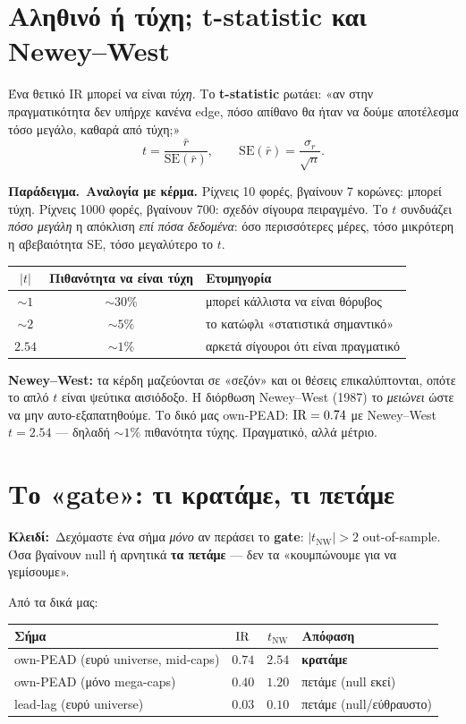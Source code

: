 \documentclass[11pt]{article}
\newcommand{\key}[1]{\par\medskip\noindent\colorbox{soft}{\parbox{\dimexpr\linewidth-2\fboxsep}{\textcolor{accent}{\textbf{Κλειδί:}}\ #1}}\par\medskip}
\newcommand{\ex}[1]{\par\smallskip\noindent\textbf{\textcolor{accent}{Παράδειγμα.}}\ #1\par\smallskip}
\begin{document}
\section{Αληθινό ή τύχη; t-statistic και Newey--West}

Ένα θετικό IR μπορεί να είναι \emph{τύχη}. Το \textbf{t-statistic} ρωτάει: «αν στην πραγματικότητα δεν
υπήρχε κανένα edge, πόσο απίθανο θα ήταν να δούμε αποτέλεσμα τόσο μεγάλο, καθαρά από τύχη;»
\[
t=\frac{\bar r}{\mathrm{SE}(\bar r)},\qquad \mathrm{SE}(\bar r)=\frac{\sigma_r}{\sqrt{n}}.
\]

\ex{\textbf{Αναλογία με κέρμα.} Ρίχνεις 10 φορές, βγαίνουν 7 κορώνες: μπορεί τύχη. Ρίχνεις 1000 φορές,
βγαίνουν 700: σχεδόν σίγουρα πειραγμένο. Το $t$ συνδυάζει \emph{πόσο μεγάλη} η απόκλιση \emph{επί πόσα
δεδομένα}: όσο περισσότερες μέρες, τόσο μικρότερη η αβεβαιότητα $\mathrm{SE}$, τόσο μεγαλύτερο το $t$.}

\begin{center}
\begin{tabular}{ccl}
\toprule
$|t|$ & Πιθανότητα να είναι τύχη & Ετυμηγορία\\
\midrule
$\sim 1$ & $\sim 30\%$ & μπορεί κάλλιστα να είναι θόρυβος\\
$\sim 2$ & $\sim 5\%$ & το κατώφλι «στατιστικά σημαντικό»\\
$2.54$ & $\sim 1\%$ & αρκετά σίγουροι ότι είναι πραγματικό\\
\bottomrule
\end{tabular}
\end{center}

\textbf{Newey--West:} τα κέρδη μαζεύονται σε «σεζόν» και οι θέσεις επικαλύπτονται, οπότε το απλό $t$
είναι ψεύτικα αισιόδοξο. Η διόρθωση Newey--West (1987) το \emph{μειώνει} ώστε να μην αυτο-εξαπατηθούμε.
Το δικό μας own-PEAD: $\mathrm{IR}=0.74$ με Newey--West $t=2.54$ --- δηλαδή $\sim 1\%$ πιθανότητα τύχης. Πραγματικό,
αλλά μέτριο.

\section{Το «gate»: τι κρατάμε, τι πετάμε}

\key{Δεχόμαστε ένα σήμα \emph{μόνο} αν περάσει το \textbf{gate}: $|t_{\text{NW}}|>2$ out-of-sample. Όσα
βγαίνουν null ή αρνητικά \textbf{τα πετάμε} --- δεν τα «κουμπώνουμε για να γεμίσουμε».}

Από τα δικά μας:
\begin{center}
\begin{tabular}{lccl}
\toprule
Σήμα & $\mathrm{IR}$ & $t_{\text{NW}}$ & Απόφαση\\
\midrule
own-PEAD (ευρύ universe, mid-caps) & $0.74$ & $2.54$ & \textcolor{accent}{\textbf{κρατάμε}}\\
own-PEAD (μόνο mega-caps) & $0.40$ & $1.20$ & πετάμε (null εκεί)\\
lead-lag (ευρύ universe) & $0.03$ & $0.10$ & πετάμε (null/εύθραυστο)\\
\bottomrule
\end{tabular}
\end{center}
\end{document}
